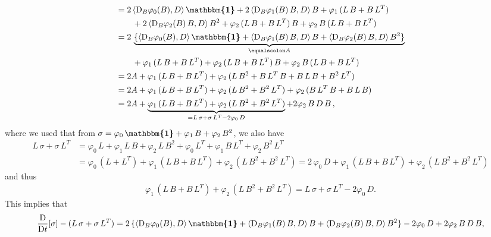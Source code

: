\documentclass[10pt]{article}
\numberwithin{theoremCounter}{section}
\theoremstyle{plain}
\theoremstyle{definition}
\newcommand{\id}{{\boldsymbol{\mathbbm{1}}}}
\newcommand{\DD}{\mathrm{D}}
\numberwithin{equation}{section}
\begin{document}
\begin{appendix}
\begin{equation}
\begin{alignedat}{2}
	&= 2\, \langle \DD_B\varphi_0(B), D \rangle \, \id + 2 \, \langle \DD_B \varphi_1(B) \, B, D \rangle \, B + \varphi_1 \, (L\, B + B \, L^T) \\
	&\qquad + 2 \, \langle \DD_B \varphi_2(B) \, B, D \rangle \, B^2 + \varphi_2 \, (L \, B + B \, L^T) \, B + \varphi_2 \, B \, (L \, B + B \, L^T) \\
	&= 2 \, \underbrace{\{\langle \DD_B\varphi_0(B), D \rangle \, \id + \langle \DD_B \varphi_1(B) \, B, D \rangle \, B + \langle \DD_B \varphi_2(B) \, B, D \rangle \, B^2\}}_{\equalscolon A} \\
	&\qquad + \varphi_1 \, (L\, B + B \, L^T) + \varphi_2 \, (L \, B + B \, L^T) \, B + \varphi_2 \, B \, (L \, B + B \, L^T) \\
	&= 2A + \varphi_1 \, (L\, B + B \, L^T) + \varphi_2 \, (L \, B^2 + B \, L^T \, B + B \, L \, B + B^2 \, L^T) \\
	&= 2A + \varphi_1 \, (L\, B + B \, L^T) + \varphi_2 \, (L \, B^2 + B^2 \, L^T) + \varphi_2 \, (B \, L^T \, B + B \, L \, B) \\
	&= 2A + \underbrace{\varphi_1 \, (L\, B + B \, L^T) + \varphi_2 \, (L \, B^2 + B^2 \, L^T)}_{= L\, \sigma + \sigma \, L^T - 2\varphi_0 \, D} + 2\varphi_2 \, B \, D \, B \, ,
	\end{alignedat}
	\end{equation}
where we used that from $\sigma = \varphi_0 \, \id + \varphi_1 \, B + \varphi_2 \, B^2$, we also have
	\begin{equation}
	\begin{alignedat}{2}
	L\, \sigma + \sigma \, L^T &= \varphi_0 \, L + \varphi_1 \, L \, B + \varphi_2 \, L \, B^2 + \varphi_0 \, L^T + \varphi_1 \, B \, L^T + \varphi_2 \, B^2 \, L^T \\
	&= \varphi_0 \, (L + L^T) + \varphi_1 \, (L \, B + B \, L^T) + \varphi_2 \, (L \, B^2 + B^2 \, L^T) = 2 \, \varphi_0 \, D + \varphi_1 \, (L \, B + B \, L^T) + \varphi_2 \, (L \, B^2 + B^2 \, L^T)
	\end{alignedat}
	\end{equation}
and thus
	\begin{align}
	\varphi_1 \, (L \, B + B \, L^T) + \varphi_2 \, (L \, B^2 + B^2 \, L^T) = L\, \sigma + \sigma \, L^T - 2 \varphi_0 \, D.
	\end{align}
%
\noindent This implies that
	\begin{equation}
	\begin{alignedat}{2}
	\frac{\DD}{\DD t}[\sigma] - (L \, \sigma + \sigma \, L^T) &= 2 \, \{\langle \DD_B\varphi_0(B), D \rangle \, \id + \langle \DD_B \varphi_1(B) \, B, D \rangle \, B + \langle \DD_B \varphi_2(B) \, B, D \rangle \, B^2\} - 2 \varphi_0 \, D + 2 \varphi_2 \, B \, D \, B,

\end{alignedat}
\end{equation}
\end{appendix}
\end{document}
